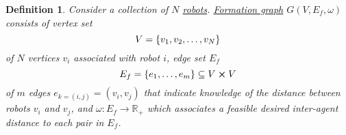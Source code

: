\documentclass[]{article}
\numberwithin{equation}{section}
\newcommand{\R}{\mathbb{R}}
\newtheorem{definition}{Definition}
\begin{document}


















\begin{definition} \label{def:form_graph_def}
    Consider a collection of $N$ \underline{\emph{robots}}.
    \emph{\underline{Formation graph}} $G(V, E_f, \omega)$ consists of vertex set \[
        V = \qty{v_1,v_2,\dots,v_N}
    \] of $N$ vertices $v_i$ associated with robot $i$, edge set $E_f$\[
        E_f = \qty{e_1, \dots, e_m} \subseteq V \cross V
    \] of $m$ edges $e_{k=(i,j)} = (v_i,v_j)$ that indicate knowledge of the distance between robots $v_i$ and $v_j$, 
    and $\omega : E_f \to \R_{+}$ which associates a feasible desired inter-agent distance to each pair in $E_f$.
\end{definition}
\end{document}
